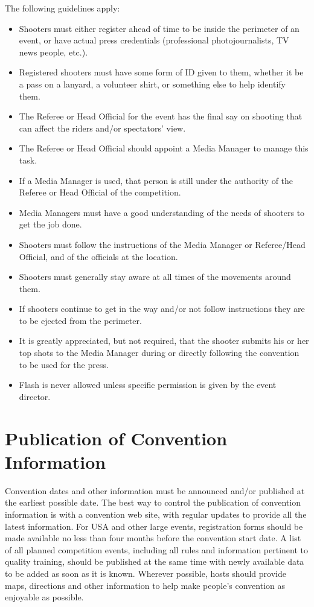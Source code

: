 The following guidelines apply:
\begin{itemize}
\item Shooters must either register ahead of time to be inside the perimeter of an event, or have actual press credentials (professional photojournalists, TV news people, etc.).
\item Registered shooters must have some form of ID given to them, whether it be a pass on a lanyard, a volunteer shirt, or something else to help identify them.
\item The Referee or Head Official for the event has the final say on shooting that can affect the riders and/or spectators' view.
\item The Referee or Head Official should appoint a Media Manager to manage this task.
\item If a Media Manager is used, that person is still under the authority of the Referee or Head Official of the competition.
\item Media Managers must have a good understanding of the needs of shooters to get the job done.
\item Shooters must follow the instructions of the Media Manager or Referee/Head Official, and of the officials at the location.
\item Shooters must generally stay aware at all times of the movements around them.
\item If shooters continue to get in the way and/or not follow instructions they are to be ejected from the perimeter.
\item It is greatly appreciated, but not required, that the shooter submits his or her top shots to the Media Manager during or directly following the convention to be used for the press.
\item Flash is never allowed unless specific permission is given by the event director.
\end{itemize}

\section{Publication of Convention Information}

Convention dates and other information must be announced and/or published at the earliest possible date.
The best way to control the publication of convention information is with a convention web site, with regular updates to provide all the latest information.
For USA and other large events, registration forms should be made available no less than four months before the convention start date.
A list of all planned competition events, including all rules and information pertinent to quality training, should be published at the same time with newly available data to be added as soon as it is known.
Wherever possible, hosts should provide maps, directions and other information to help make people's convention as enjoyable as possible.

